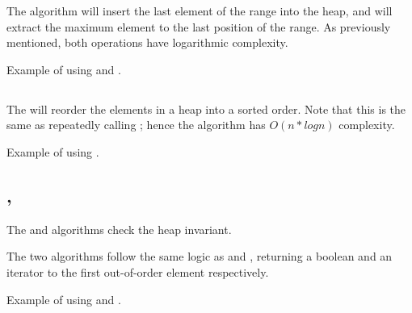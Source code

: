 The  algorithm will insert the last element of the range into the heap, and  will extract the maximum element to the last position of the range. As previously mentioned, both operations have logarithmic complexity.

\begin{box-note}
\footnotesize Example of using  and .
\tcblower
{}
\end{box-note}

\subsection{\texorpdfstring{}{\texttt{std::sort\_heap}}}

The  will reorder the elements in a heap into a sorted order. Note that this is the same as repeatedly calling ; hence the algorithm has $O(n*logn)$ complexity.


\begin{box-note}
\footnotesize Example of using .
\tcblower
{}
\end{box-note}

\subsection{\texorpdfstring{, }{\texttt{std::is\_heap}, \texttt{std::is\_heap\_until}}}

The  and  algorithms check the heap invariant.



The two algorithms follow the same logic as  and , returning a boolean and an iterator to the first out-of-order element respectively.

\begin{box-note}
\footnotesize Example of using  and .
\tcblower
{}
\end{box-note}


